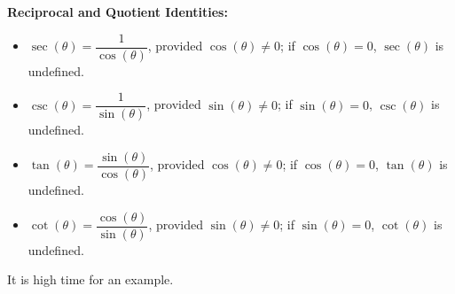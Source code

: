 \colorbox{ResultColor}{\bbm

\begin{thm} \label{recipquotid}  \textbf{Reciprocal and Quotient Identities:}   

\begin{itemize}

\item $\sec(\theta) = \dfrac{1}{\cos(\theta)}$, provided $\cos(\theta) \neq 0$;  if $\cos(\theta) = 0$, $\sec(\theta)$ is undefined.

\item $\csc(\theta) = \dfrac{1}{\sin(\theta)}$, provided $\sin(\theta) \neq 0$;  if $\sin(\theta) = 0$, $\csc(\theta)$ is undefined.

\item $\tan(\theta) = \dfrac{\sin(\theta)}{\cos(\theta)}$, provided $\cos(\theta) \neq 0$;  if $\cos(\theta) = 0$, $\tan(\theta)$ is undefined.

\item $\cot(\theta) = \dfrac{\cos(\theta)}{\sin(\theta)}$, provided $\sin(\theta) \neq 0$;  if $\sin(\theta) = 0$, $\cot(\theta)$ is undefined.

\end{itemize}

\end{thm}

\ebm}

\medskip

It is high time for an example.


